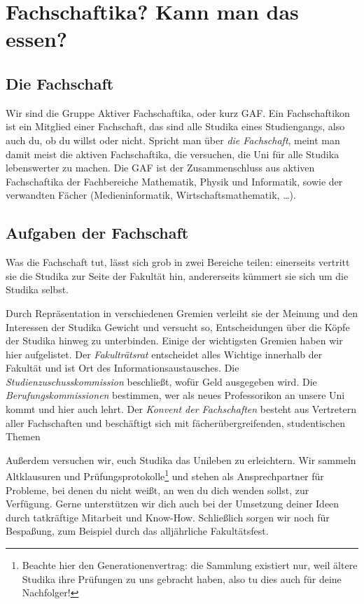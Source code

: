 
%
	
\chapter{Fachschaftika? Kann man das essen?}

\section{Die Fachschaft}
Wir sind die Gruppe Aktiver Fachschaftika, oder kurz GAF. Ein Fachschaftikon ist ein Mitglied einer Fachschaft, das sind alle Studika eines Studiengangs, also auch du, ob du willst oder nicht. Spricht man über \emph{die Fachschaft}, meint man damit meist die aktiven Fachschaftika, die versuchen, die Uni für alle Studika lebenswerter zu machen. Die GAF ist der Zusammenschluss aus aktiven Fachschaftika der Fachbereiche Mathematik, Physik und Informatik, sowie der verwandten Fächer (Medieninformatik, Wirtschaftsmathematik, \ldots).

\section{Aufgaben der Fachschaft}

Was die Fachschaft tut, lässt sich grob in zwei Bereiche teilen: einerseits vertritt sie die Studika zur Seite der Fakultät hin, andererseits kümmert sie sich um die Studika selbst.

Durch Repräsentation in verschiedenen Gremien verleiht sie der Meinung und den Interessen der Studika Gewicht und versucht so, Entscheidungen über die Köpfe der Studika hinweg zu unterbinden. Einige der wichtigsten Gremien haben wir hier aufgelistet.
Der \emph{Fakulträtsrat} entscheidet alles Wichtige innerhalb der Fakultät und ist Ort des Informationsaustausches.
Die \emph{Studienzuschusskommission} beschließt, wofür Geld ausgegeben wird.
Die \emph{Berufungskommissionen} bestimmen, wer als neues Professorikon an unsere Uni kommt und hier auch lehrt.
Der \emph{Konvent der Fachschaften} besteht aus Vertretern aller Fachschaften und beschäftigt sich mit fächerübergreifenden, studentischen Themen

Außerdem versuchen wir, euch Studika das Unileben zu erleichtern. Wir sammeln Altklausuren und Prüfungsprotokolle\footnote{Beachte hier den Generationenvertrag: die Sammlung existiert nur, weil ältere Studika ihre Prüfungen zu uns gebracht haben, also tu dies auch für deine Nachfolger!} und stehen als Ansprechpartner für Probleme, bei denen du nicht weißt, an wen du dich wenden sollst, zur Verfügung. Gerne unterstützen wir dich auch bei der Umsetzung deiner Ideen durch tatkräftige Mitarbeit und Know-How. Schließlich sorgen wir noch für Bespaßung, zum Beispiel durch das alljährliche Fakultätsfest.

